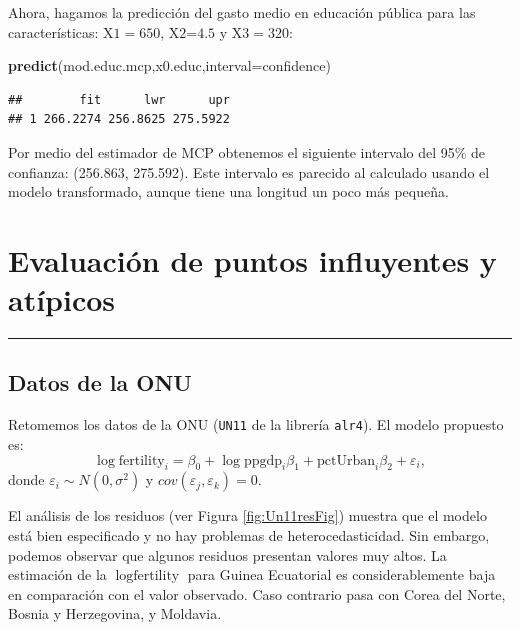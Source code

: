 \documentclass[
]{article}
\newenvironment{Shaded}{\begin{snugshade}}{\end{snugshade}}
\newcommand{\AttributeTok}[1]{\textcolor[rgb]{0.13,0.29,0.53}{#1}}
\newcommand{\FunctionTok}[1]{\textcolor[rgb]{0.13,0.29,0.53}{\textbf{#1}}}
\newcommand{\NormalTok}[1]{#1}
\newcommand{\StringTok}[1]{\textcolor[rgb]{0.31,0.60,0.02}{#1}}
\begin{document}
Ahora, hagamos la predicción del gasto medio en educación pública para las características: \(\mbox{X1}=650\), \(\mbox{X2=4.5}\) y \(\mbox{X3}=320\):

\begin{Shaded}
\begin{Highlighting}[]
\FunctionTok{predict}\NormalTok{(mod.educ.mcp,x0.educ,}\AttributeTok{interval=}\StringTok{\textquotesingle{}confidence\textquotesingle{}}\NormalTok{)}
\end{Highlighting}
\end{Shaded}

\begin{verbatim}
##        fit      lwr      upr
## 1 266.2274 256.8625 275.5922
\end{verbatim}

Por medio del estimador de MCP obtenemos el siguiente intervalo del 95\% de confianza: (256.863, 275.592). Este intervalo es parecido al calculado usando el modelo transformado, aunque tiene una longitud un poco más pequeña.

\hypertarget{evaluaciuxf3n-de-puntos-influyentes-y-atuxedpicos}{%
\section{Evaluación de puntos influyentes y atípicos}\label{evaluaciuxf3n-de-puntos-influyentes-y-atuxedpicos}}

\rule{\textwidth}{0.4pt}

\hypertarget{datos-de-la-onu}{%
\subsection{Datos de la ONU}\label{datos-de-la-onu}}

Retomemos los datos de la ONU (\texttt{UN11} de la librería \texttt{alr4}). El modelo propuesto es:
\begin{equation}
\log \mbox{fertility}_{i} = \beta_{0} + \log \mbox{ppgdp}_{i}\beta_{1} + \mbox{pctUrban}_{i}\beta_{2} + \varepsilon_{i},
\label{eq:modUN}
\end{equation}
donde \(\varepsilon_{i}\sim N(0,\sigma^{2})\) y \(cov(\varepsilon_{j},\varepsilon_{k})=0\).

El análisis de los residuos (ver Figura \ref{fig:Un11resFig}) muestra que el modelo está bien especificado y no hay problemas de heterocedasticidad. Sin embargo, podemos observar que algunos residuos presentan valores muy altos. La estimación de la \(\log \mbox{fertility}\) para Guinea Ecuatorial es considerablemente baja en comparación con el valor observado. Caso contrario pasa con Corea del Norte, Bosnia y Herzegovina, y Moldavia.
\end{document}
